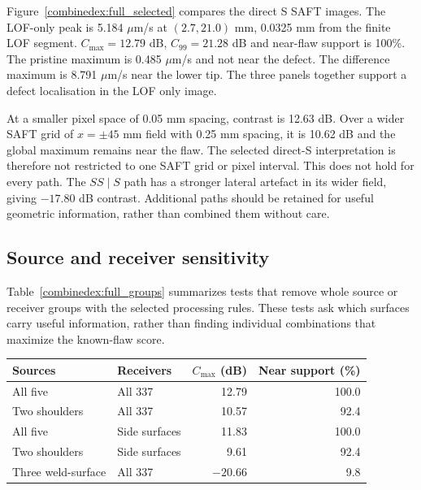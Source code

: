 Figure~\ref{combinedex:full_selected} compares the direct S SAFT images. The LOF-only peak is 5.184 $\mu$m/s at $(2.7,21.0)$ mm, 0.0325 mm from the finite LOF segment. $C_{\max}=12.79$ dB, $C_{99}=21.28$ dB and near-flaw support is 100\%.  The pristine maximum is 0.485 $\mu$m/s and not near the defect. The difference maximum is 8.791 $\mu$m/s near the lower tip. The three panels together support a defect localisation in the LOF only image.

At a smaller pixel space of 0.05 mm spacing, contrast is 12.63 dB. Over a wider SAFT grid of  $x=\pm45$ mm field with 0.25 mm spacing, it is 10.62 dB and the global maximum remains near the flaw. The selected direct-S interpretation is therefore not restricted to one SAFT grid or pixel interval. This does not hold for every path. The  $SS\mid S$ path has a stronger lateral artefact in its wider field, giving $-17.80$ dB contrast. Additional paths should be retained for useful geometric information, rather than combined them without care.

\subsection{Source and receiver sensitivity}
Table~\ref{combinedex:full_groups} summarizes tests that remove whole source or receiver groups with the selected processing rules. These tests ask which surfaces carry useful information, rather than finding individual combinations that maximize the known-flaw score.

\par\medskip\noindent\begin{minipage}{\linewidth}\centering\small
{}
\begin{tabularx}{\linewidth}{@{}XXrr@{}}\toprule
Sources & Receivers & $C_{\max}$ (dB) & Near support (\%)\\\midrule
All five & All 337 & 12.79 & 100.0\\
Two shoulders & All 337 & 10.57 & 92.4\\
All five & Side surfaces & 11.83 & 100.0\\
Two shoulders & Side surfaces & 9.61 & 92.4\\
Three weld-surface & All 337 & $-20.66$ & 9.8\\
\bottomrule\end{tabularx}
\label{combinedex:full_groups}
\end{minipage}\par\medskip

